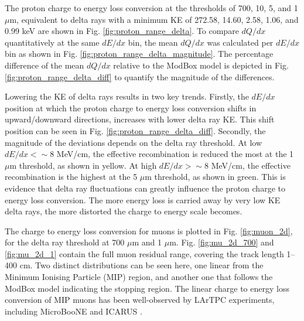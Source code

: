 The proton charge to energy loss conversion at the thresholds of 700, 10, 5, and 1 $\mu$m, equivalent to delta rays with a minimum KE of 272.58, 14.60, 2.58, 1.06, and 0.99 keV are shown in Fig. \ref{fig:proton_range_delta}. 
To compare $dQ/dx$ quantitatively at the same $dE/dx$ bin, the mean $dQ/dx$ was calculated per $dE/dx$ bin as shown in Fig. \ref{fig:proton_range_delta_magnitude}.
The percentage difference of the mean $dQ/dx$ relative to the ModBox model is depicted in Fig. \ref{fig:proton_range_delta_diff} to quantify the magnitude of the differences.

Lowering the KE of delta rays results in two key trends.                                                         
Firstly, the $dE/dx$ position at which the proton charge to energy loss conversion shifts in upward/downward directions, increases with lower delta ray KE. 
This shift position can be seen in Fig. \ref{fig:proton_range_delta_diff}.
Secondly, the magnitude of the deviations depends on the delta ray threshold. 
At low $dE/dx < \sim 8$ MeV/cm, the effective recombination is reduced the most at the 1 $\mu$m threshold, as shown in yellow.
At high $dE/dx > \sim 8$ MeV/cm, the effective recombination is the highest at the 5 $\mu$m threshold, as shown in green.
This is evidence that delta ray fluctuations can greatly influence the proton charge to energy loss conversion.
The more energy loss is carried away by very low KE delta rays, the more distorted the charge to energy scale becomes.


The charge to energy loss conversion for muons is plotted in Fig. \ref{fig:muon_2d}, for the delta ray threshold at 700 $\mu$m and 1 $\mu$m.
Fig. \ref{fig:mu_2d_700} and \ref{fig:mu_2d_1} contain the full muon residual range, covering the track length 1--400 cm.
Two distinct distributions can be seen here, one linear from the Minimum Ionising Particle (MIP) region, and another one that follows the ModBox model indicating the stopping region. 
The linear charge to energy loss conversion of MIP muons has been well-observed by LArTPC experiments, including MicroBooNE \cite{uboone_calib} and ICARUS \cite{icarus_recomb}.

